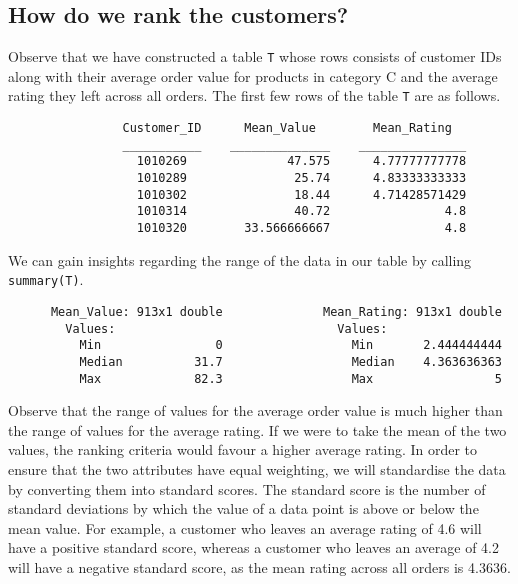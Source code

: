 \subsection{How do we rank the customers?}
Observe that we have constructed a table \lstinline|T| whose rows consists of customer IDs along with their average order value for products in category C and the average rating they left across all orders. The first few rows of the table \lstinline|T| are as follows.

\begin{lstlisting}
                Customer_ID      Mean_Value        Mean_Rating   
                ___________    ______________    _______________
                  1010269              47.575      4.77777777778
                  1010289               25.74      4.83333333333
                  1010302               18.44      4.71428571429
                  1010314               40.72                4.8
                  1010320        33.566666667                4.8  
\end{lstlisting}

\noindent
We can gain insights regarding the range of the data in our table by calling \lstinline|summary(T)|.

\begin{lstlisting}
      Mean_Value: 913x1 double              Mean_Rating: 913x1 double            
        Values:                               Values:            
          Min                0                  Min       2.444444444                
          Median          31.7                  Median    4.363636363                
          Max             82.3                  Max                 5    
\end{lstlisting}

\noindent
Observe that the range of values for the average order value is much higher than the range of values for the average rating. If we were to take the mean of the two values, the ranking criteria would favour a higher average rating. In order to ensure that the two attributes have equal weighting, we will standardise the data by converting them into standard scores. The standard score is the number of standard deviations by which the value of a data point is above or below the mean value. For example, a customer who leaves an average rating of 4.6 will have a positive standard score, whereas a customer who leaves an average of 4.2 will have a negative standard score, as the mean rating across all orders is 4.3636.

